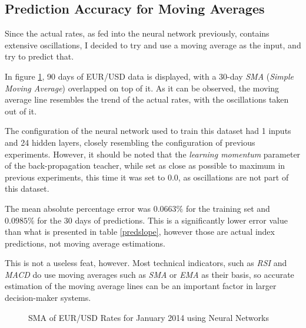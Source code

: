 \documentclass[a4paper,12pt]{article}
\begin{document}
\newpage
\subsection{Prediction Accuracy for Moving Averages}

	Since the actual rates, as fed into the neural network previously, contains extensive oscillations, I decided to try and use a moving average as the input, and try to predict that.
	
	In figure \ref{eur_usd_sma_january_90}, 90 days of EUR/USD data is displayed, with a 30-day \textit{SMA} (\textit{Simple Moving Average}) overlapped on top of it. As it can be observed, the moving average line resembles the trend of the actual rates, with the oscillations taken out of it.
	
	The configuration of the neural network used to train this dataset had 1 inputs and 24 hidden layers, closely resembling the configuration of previous experiments. However, it should be noted that the \textit{learning momentum} parameter of the back-propagation teacher, while set as close as possible to maximum in previous experiments, this time it was set to $0.0$, as oscillations are not part of this dataset.

	The mean absolute percentage error was $0.0663\%$ for the training set and $0.0985\%$ for the 30 days of predictions. This is a significantly lower error value than what is presented in table \ref{predslope}, however those are actual index predictions, not moving average estimations.

	This is not a useless feat, however. Most technical indicators, such as \textit{RSI} and \textit{MACD} do use moving averages such as \textit{SMA} or \textit{EMA} as their basis, so accurate estimation of the moving average lines can be an important factor in larger decision-maker systems.

	\begin{figure}[!htbp]
		\centering
		\caption{SMA of EUR/USD Rates for January 2014 using Neural Networks}
		\label{eur_usd_sma_january_90}
	\end{figure}
\end{document}
